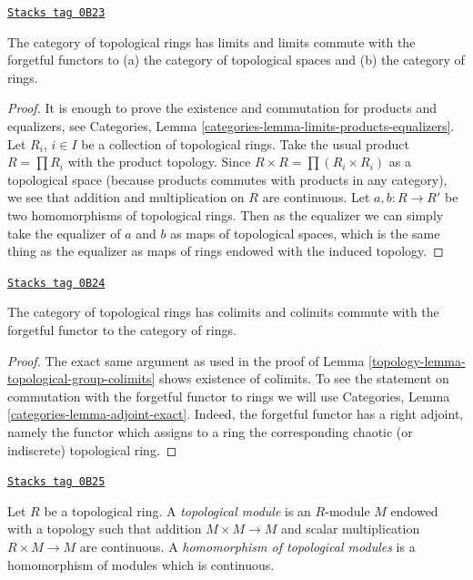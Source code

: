 \begin{lemma}
\label{topology-lemma-topological-ring-limits}
\href{https://stacks.math.columbia.edu/tag/0B23}{\texttt{Stacks tag 0B23}}

The category of topological rings has limits and limits commute
with the forgetful functors to (a) the category of topological spaces and
(b) the category of rings.
\end{lemma}

\begin{proof}
It is enough to prove the existence and commutation for products and
equalizers, see
Categories, Lemma \ref{categories-lemma-limits-products-equalizers}.
Let $R_i$, $i \in I$ be a collection of topological rings.
Take the usual product $R = \prod R_i$ with the product topology.
Since $R \times R = \prod (R_i \times R_i)$ as a topological space
(because products commutes with products in any category), we
see that addition and multiplication on $R$ are continuous. Let
$a, b : R \to R'$ be two homomorphisms of topological rings.
Then as the equalizer we can simply take the equalizer of $a$ and $b$
as maps of topological spaces, which is the same thing as the equalizer
as maps of rings endowed with the induced topology.
\end{proof}

\begin{lemma}
\label{topology-lemma-topological-ring-colimits}
\href{https://stacks.math.columbia.edu/tag/0B24}{\texttt{Stacks tag 0B24}}

The category of topological rings has colimits and colimits commute
with the forgetful functor to the category of rings.
\end{lemma}

\begin{proof}

The exact same argument as used in the proof of
Lemma \ref{topology-lemma-topological-group-colimits} shows existence of colimits.
To see the statement on commutation with the forgetful functor to
rings we will use Categories, Lemma \ref{categories-lemma-adjoint-exact}.
Indeed, the forgetful functor has a right adjoint, namely the functor which
assigns to a ring the corresponding chaotic (or indiscrete) topological ring.
\end{proof}

\begin{definition}
\label{topology-definition-topological-module}
\href{https://stacks.math.columbia.edu/tag/0B25}{\texttt{Stacks tag 0B25}}

Let $R$ be a topological ring. A {\it topological module} is an $R$-module
$M$ endowed with a topology such that addition $M \times M \to M$ and
scalar multiplication $R \times M \to M$ are continuous.
A {\it homomorphism of topological modules} is a homomorphism of
modules which is continuous.
\end{definition}

